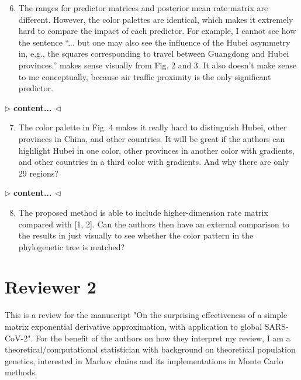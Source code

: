 \documentclass[12pt]{article}
\newenvironment{reply}{$\triangleright$\bfseries}{$\triangleleft$}
\begin{document}
\begin{enumerate}	
\setcounter{enumi}{5}	
	\item The ranges for predictor matrices and posterior mean rate matrix are different. However, the color palettes are identical, which makes it extremely hard to compare the impact of each predictor. For example, I cannot see how the sentence “... but one may also see the influence of the Hubei asymmetry in, e.g., the squares corresponding to travel between Guangdong and Hubei provinces.” makes sense visually from Fig. 2 and 3. It also doesn’t make sense to me conceptually, because air traffic proximity is the only significant predictor.
\end{enumerate}

\begin{reply}
content...
\end{reply}

\begin{enumerate}	
\setcounter{enumi}{6}	
	\item 
	The color palette in Fig. 4 makes it really hard to distinguish Hubei, other provinces in China, and other countries. It will be great if the authors can highlight Hubei in one color, other provinces in another color with gradients, and other countries in a third color with gradients. And why there are only 29 regions?
\end{enumerate}

\begin{reply}
content...
\end{reply}

\begin{enumerate}	
\setcounter{enumi}{7}	
	\item 
	The proposed method is able to include higher-dimension rate matrix compared with \citet{lemey2009bayesian,lemey2014unifying} [1, 2]. Can the authors then have an external comparison to the results in \citet{lemey2020accommodating} just visually to see whether the color pattern in the phylogenetic tree is matched?
\end{enumerate}



\section*{Reviewer 2}

This is a review for the manuscript "On the surprising effectiveness of a simple matrix exponential derivative approximation, with application to global SARS-CoV-2". 
For the benefit of the authors on how they interpret my review, I am a theoretical/computational statistician with background on theoretical population genetics, interested in Markov chains and its implementations in Monte Carlo methods. 
\end{document}
